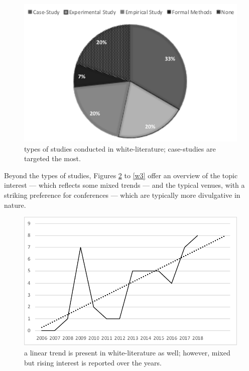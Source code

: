 \begin{figure}
\begin{center}
\includegraphics[scale=0.5]{./img/weval.png}
\end{center}
\caption{types of studies conducted in white-literature; case-studies are targeted the most.}\label{w1}
\end{figure}

Beyond the types of studies, Figures \ref{w2} to \ref{w3} offer an overview of the topic interest --- which reflects some mixed trends --- and the typical venues, with a striking preference for conferences --- which are typically more divulgative in nature.

\begin{figure}
\begin{center}
\includegraphics[scale=0.6]{./img/wtimeline.pdf}
\end{center}
\caption{a linear trend is present in white-literature as well; however, mixed but rising interest is reported over the years.}\label{w2}
\end{figure}

